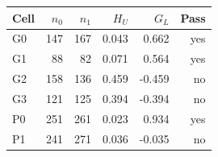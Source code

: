 \begin{tabular}{@{}lrrrrr@{}}
\toprule
Cell & $n_0$ & $n_1$ & $H_U$ & $G_L$ & Pass\\
\midrule
G0 & 147 & 167 & 0.043 & 0.662 & yes\\
G1 & 88 & 82 & 0.071 & 0.564 & yes\\
G2 & 158 & 136 & 0.459 & -0.459 & no\\
G3 & 121 & 125 & 0.394 & -0.394 & no\\
P0 & 251 & 261 & 0.023 & 0.934 & yes\\
P1 & 241 & 271 & 0.036 & -0.035 & no\\
\bottomrule
\end{tabular}
